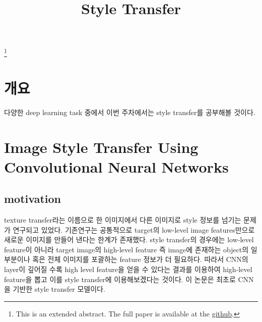 \documentclass[extendedabs]{bmvc2k}
\begin{document}
\title{Style Transfer}
\maketitle
\let\thefootnote\relax\footnote{This is an extended abstract. The full paper is available at the \href{https://github.com/LeeGwanHui/TIL/tree/main/deeplearning_ham}{github}. }
\vspace{-0.2in}
\section{개요}
 \quad 다양한 deep learning task 중에서 이번 주차에서는 style transfer를 공부해볼 것이다.

 \section{Image Style Transfer Using Convolutional Neural Networks \cite{gatys2016image}}
 \subsection{motivation}
 \quad texture transfer라는 이름으로 한 이미지에서 다른 이미지로 style 정보를 넘기는 문제가 연구되고 있었다. 기존연구는 공통적으로 target의 low-level image features만으로 새로운 이미지를 만들어 낸다는 한계가 존재했다.
 style transfer의 경우에는 low-level feature이 아니라 target image의 high-level feature 즉 image에 존재하는 object의 일부분이나 혹은 전체 이미지를 포괄하는 feature 정보가 더 필요하다.
 따라서 CNN의 layer이 깊어질 수록 high level feature을 얻을 수 있다는 결과를 이용하여 high-level feature을 뽑고 이를 style transfer에 이용해보겠다는 것이다.
 이 논문은 최초로 CNN을 기반한 style transfer 모델이다.\cite{youtube_Style}
 
\end{document}
